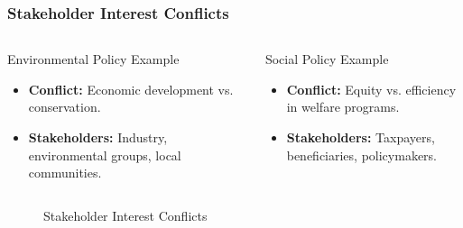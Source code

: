 \documentclass[10pt]{beamer}
\begin{document}
\begin{frame}
\frametitle{Stakeholder Interest Conflicts}
\begin{columns}[T,onlytextwidth]
   \begin{block}{Environmental Policy Example}
       \begin{itemize}
           \item \textbf{Conflict:} Economic development vs. conservation.
           \item \textbf{Stakeholders:} Industry, environmental groups, local communities.
       \end{itemize}
   \end{block}
   \begin{block}{Social Policy Example}
       \begin{itemize}
           \item \textbf{Conflict:} Equity vs. efficiency in welfare programs.
           \item \textbf{Stakeholders:} Taxpayers, beneficiaries, policymakers.
       \end{itemize}
   \end{block}
\end{columns}

\begin{figure}
   \centering
   \caption{Stakeholder Interest Conflicts}
\end{figure}
\end{frame}
\end{document}

